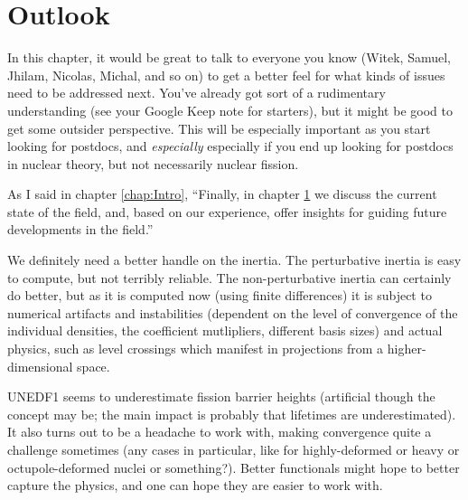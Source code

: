 \chapter{Outlook}\label{chap:Outlook}
\maketitle

In this chapter, it would be great to talk to everyone you know (Witek, Samuel, Jhilam, Nicolas, Michal, and so on) to get a better feel for what kinds of issues need to be addressed next. You've already got sort of a rudimentary understanding (see your Google Keep note for starters), but it might be good to get some outsider perspective. This will be especially important as you start looking for postdocs, and \textit{especially} especially if you end up looking for postdocs in nuclear theory, but not necessarily nuclear fission.

As I said in chapter \ref{chap:Intro}, ``Finally, in chapter \ref{chap:Outlook} we discuss the current state of the field, and, based on our experience, offer insights for guiding future developments in the field.''

We definitely need a better handle on the inertia. The perturbative inertia is easy to compute, but not terribly reliable. The non-perturbative inertia can certainly do better, but as it is computed now (using finite differences) it is subject to numerical artifacts and instabilities (dependent on the level of convergence of the individual densities, the coefficient mutlipliers, different basis sizes) and actual physics, such as level crossings which manifest in projections from a higher-dimensional space.

UNEDF1 seems to underestimate fission barrier heights (artificial though the concept may be; the main impact is probably that lifetimes are underestimated). It also turns out to be a headache to work with, making convergence quite a challenge sometimes (any cases in particular, like for highly-deformed or heavy or octupole-deformed nuclei or something?). Better functionals might hope to better capture the physics, and one can hope they are easier to work with.